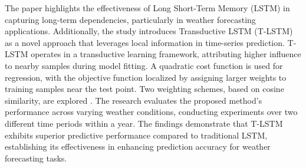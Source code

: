 \documentclass[sn-mathphys,Numbered]{sn-jnl}
\theoremstyle{thmstyleone}
\theoremstyle{thmstyletwo}
\theoremstyle{thmstylethree}
\begin{document}
  \cite{XIAO2019111358} The paper highlights the effectiveness of Long Short-Term Memory (LSTM) in capturing long-term dependencies, particularly in weather forecasting applications. Additionally, the study introduces Transductive LSTM (T-LSTM) as a novel approach that leverages local information in time-series prediction. T-LSTM operates in a transductive learning framework, attributing higher influence to nearby samples during model fitting. A quadratic cost function is used for regression, with the objective function localized by assigning larger weights to training samples near the test point. Two weighting schemes, based on cosine similarity, are explored \cite{XIAO2019111358}.
The research evaluates the proposed method's performance across varying weather conditions, conducting experiments over two different time periods within a year. The findings demonstrate that T-LSTM exhibits superior predictive performance compared to traditional LSTM, establishing its effectiveness in enhancing prediction accuracy for weather forecasting tasks.
\end{document}

